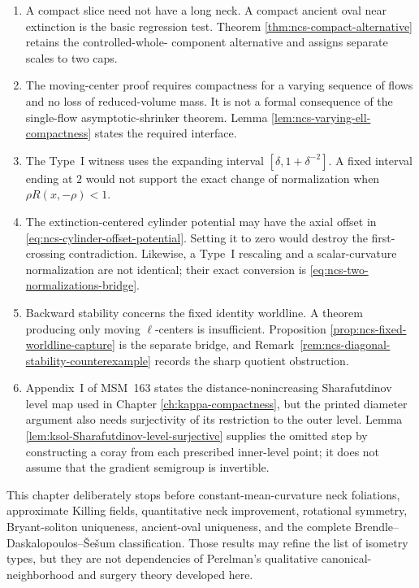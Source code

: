 \documentclass[10pt]{coll-l}
\theoremstyle{definition}
\theoremstyle{remark}
\numberwithin{section}{chapter}
\numberwithin{equation}{chapter}
\begin{document}
\begin{enumerate}
\item A compact slice need not have a long neck.  A compact ancient oval
      near extinction is the basic regression test.  Theorem
      \ref{thm:ncs-compact-alternative} retains the controlled-whole-
      component alternative and assigns separate scales to two caps.

\item The moving-center proof requires compactness for a varying sequence
      of flows and no loss of reduced-volume mass.  It is not a formal
      consequence of the single-flow asymptotic-shrinker theorem.  Lemma
      \ref{lem:ncs-varying-ell-compactness} states the required interface.

\item The Type~I witness uses the expanding interval
      $[\delta,1+\delta^{-2}]$.  A fixed interval ending at $2$ would not
      support the exact change of normalization when
      $\rho R(x,-\rho)<1$.

\item The extinction-centered cylinder potential may have the axial offset
      in \eqref{eq:ncs-cylinder-offset-potential}.  Setting it to zero would
      destroy the first-crossing contradiction.  Likewise, a Type~I
      rescaling and a scalar-curvature normalization are not identical;
      their exact conversion is \eqref{eq:ncs-two-normalizations-bridge}.

\item Backward stability concerns the fixed identity worldline.  A theorem
      producing only moving $\ell$-centers is insufficient.  Proposition
      \ref{prop:ncs-fixed-worldline-capture} is the separate bridge, and
      Remark~\ref{rem:ncs-diagonal-stability-counterexample} records the
      sharp quotient obstruction.

\item Appendix~I of MSM~163 states the distance-nonincreasing
      Sharafutdinov level map used in Chapter
      \ref{ch:kappa-compactness}, but the printed diameter argument also
      needs surjectivity of its restriction to the outer level.  Lemma
      \ref{lem:ksol-Sharafutdinov-level-surjective} supplies the omitted
      step by constructing a coray from each prescribed inner-level point;
      it does not assume that the gradient semigroup is invertible.
\end{enumerate}

This chapter deliberately stops before constant-mean-curvature neck
foliations, approximate Killing fields, quantitative neck improvement,
rotational symmetry, Bryant-soliton uniqueness, ancient-oval uniqueness,
and the complete Brendle--Daskalopoulos--\v{S}e\v{s}um classification.
Those results may refine the list of isometry types, but they are not
dependencies of Perelman's qualitative canonical-neighborhood and surgery
theory developed here.

\backmatter




\printindex
\end{document}
